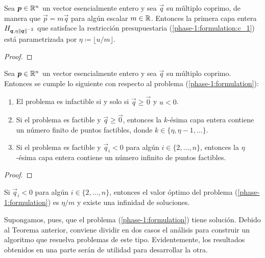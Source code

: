 \begin{lemma}
	\label{phase-1:lemma:eta}
	Sea $\boldsymbol{p} \in \mathbb{R}^n$ un vector esencialmente entero y sea $\vec{q}$ su múltiplo coprimo, de
	manera que $\vec{p} = m\vec{q}$ para algún escalar $m \in \mathbb{R}$. Entonces la primera capa entera
	$H_{\boldsymbol{q}, \eta \left\lVert \boldsymbol{q} \right\rVert^{-2}}$ que satisface la restricción presupuestaria
	(\ref{phase-1:formulation:c_1}) está parametrizada por $\eta \coloneq \lfloor u/m \rfloor$.
\end{lemma}
\begin{proof}
\end{proof}
\begin{theorem}
	\label{phase-1:th:feasibility}
	Sea $\boldsymbol{p} \in \mathbb{R}^n$ un vector esencialmente entero y sea $\vec{q}$ su múltiplo coprimo.
	Entonces se cumple lo siguiente con respecto al problema (\ref{phase-1:formulation}):
	\begin{enumerate}
		\item El problema es infactible si y solo si $\vec{q} \geq \vec{0}$ y $u < 0$.
		\item Si el problema es factible y $\vec{q} \geq \vec{0}$, entonces la $k$-ésima capa entera
			contiene un número finito de puntos factibles, donde $k \in \lbrace \eta, \eta - 1,
			\ldots \rbrace$.
		\item Si el problema es factible y $\vec{q}_i < 0$ para algún $i \in \lbrace 2, \ldots, n
			\rbrace$, entonces la $\eta$-ésima capa entera contiene un número infinito de puntos
			factibles.
	\end{enumerate}
\end{theorem}
\begin{proof}
\end{proof}
\begin{corollary}
	Si $\vec{q}_i < 0$ para algún $i \in \lbrace 2, \ldots, n \rbrace$, entonces el valor óptimo del
	problema (\ref{phase-1:formulation}) es $\eta / m$ y existe una infinidad de soluciones.
\end{corollary}

Supongamos, pues, que el problema (\ref{phase-1:formulation}) tiene solución. Debido al Teorema
anterior, conviene dividir en dos casos el análisis para construir un algoritmo que resuelva
problemas de este tipo. Evidentemente, los resultados obtenidos en una parte serán de utilidad para
desarrollar la otra.

